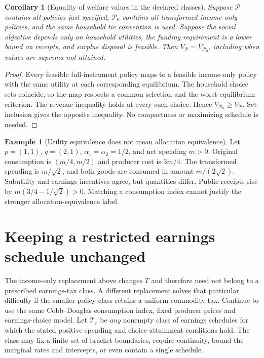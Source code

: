 \documentclass[11pt]{article}
\newtheorem{corollary}{Corollary}
\theoremstyle{definition}
\newtheorem{example}{Example}
\begin{document}
\begin{corollary}[Equality of welfare values in the declared classes]
Suppose $\mathcal P$ contains all policies just specified, $\mathcal P_0$ contains all transformed income-only policies, and the same household tie convention is used. Suppose the social objective depends only on household utilities, the funding requirement is a lower bound on receipts, and surplus disposal is feasible. Then $V_{\mathcal P}=V_{\mathcal P_0}$, including when values are suprema not attained.
\end{corollary}
\begin{proof}
Every feasible full-instrument policy maps to a feasible income-only policy with the same utility at each corresponding equilibrium. The household choice sets coincide, so the map respects a common selection and the worst-equilibrium criterion. The revenue inequality holds at every such choice. Hence $V_{\mathcal P_0}\geq V_{\mathcal P}$. Set inclusion gives the opposite inequality. No compactness or maximizing schedule is needed.
\end{proof}

\begin{example}[Utility equivalence does not mean allocation equivalence]
Let $p=(1,1)$, $q=(2,1)$, $\alpha_1=\alpha_2=1/2$, and net spending $m>0$. Original consumption is $(m/4,m/2)$ and producer cost is $3m/4$. The transformed spending is $m/\sqrt2$, and both goods are consumed in amount $m/(2\sqrt2)$. Subutility and earnings incentives agree, but quantities differ. Public receipts rise by $m(3/4-1/\sqrt2)>0$. Matching a consumption index cannot justify the stronger allocation-equivalence label.
\end{example}


\section*{Keeping a restricted earnings schedule unchanged}
The income-only replacement above changes $T$ and therefore need not
belong to a prescribed earnings-tax class. A different replacement solves
that particular difficulty if the smaller policy class retains a uniform
commodity tax. Continue to use the same Cobb--Douglas consumption index,
fixed producer prices and earnings-choice model. Let $\mathcal T_r$ be
\emph{any} nonempty class of earnings schedules for which the stated
positive-spending and choice-attainment conditions hold. The class may
fix a finite set of bracket boundaries, require continuity, bound the
marginal rates and intercepts, or even contain a single schedule.
\end{document}
